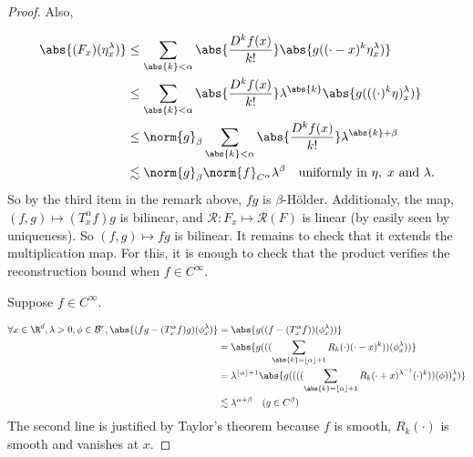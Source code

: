 \begin{proof}
    Also, 

    \begin{align*}
        \abs{(F_x)(\eta^\lambda_x)} &\leq \sum_{\abs{k}<\alpha} \abs{\frac{D^kf(x)}{k!}} \abs{g((\cdot - x)^k\eta^\lambda_x)}\\
        &\leq \sum_{\abs{k}<\alpha} \abs{\frac{D^kf(x)}{k!}} \lambda^{\abs{k}} \abs{g(((\cdot)^k\eta)^\lambda_x)}\\
        &\leq \norm{g}_\beta \sum_{\abs{k}<\alpha} \abs{\frac{D^kf(x)}{k!}} \lambda^{\abs{k}+\beta} \\
        &\lesssim \norm{g}_\beta \norm{f}_{C^\alpha} \lambda^{\beta} \quad \text{uniformly in }\eta, \; x \text{ and }\lambda.
    \end{align*}
    So by the third item in the remark above, $fg$ is $\beta$-Hölder.
    Additionaly, the map, $(f,g)\mapsto (T_x^\alpha f) g$ is bilinear, and $\mathcal{R}:F_x \mapsto \mathcal{R}(F)$ is linear (by easily seen by uniqueness). So $(f,g)\mapsto fg$ is bilinear.
    It remains to check that it extends the multiplication map. For this, it is enough to check that the product verifies the reconstruction bound when $f \in C^\infty$.
    
    Suppose $f \in C^\infty$.

    \begin{align*}
        \forall x \in \R^d, \lambda>0, \phi \in \mathcal{B}^r, \abs{(fg - (T_x^\alpha f)g)(\phi^\lambda_x)} &= \abs{g((f - (T_x^\alpha f))(\phi^\lambda_x))} \\
        &= \abs{g(((\sum_{\abs{k} = \lfloor \alpha \rfloor + 1}R_k(\cdot)(\cdot - x)^k ))(\phi^\lambda_x))} \\
        &= \lambda^{\lfloor \alpha \rfloor + 1} \abs{g((((\sum_{\abs{k} = \lfloor \alpha \rfloor + 1}R_k(\cdot + x)^{\lambda^{-1}}(\cdot)^k ))(\phi))^\lambda_x)} \\
        &\lesssim \lambda^{\alpha + \beta} \quad (g \in C^\beta)
    \end{align*}
    The second line is justified by Taylor's theorem because $f$ is smooth, $R_k(\cdot)$ is smooth and vanishes at $x$.
\end{proof}

